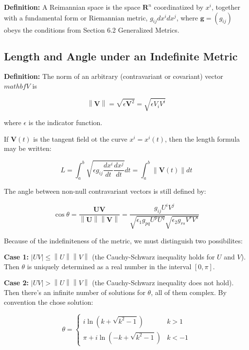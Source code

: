 \documentclass{article}
\newcommand\norm[1]{\left\lVert#1\right\rVert}
\begin{document}
\noindent \textbf{Definition: }
A Reimannian space is the space $\mathbf{ R }^n$ coordinatized by $x^i$, together with a fundamental form or Riemannian metric, $g_{ij} dx^i dx^j$, where $\mathbf{g} = (g_{ij})$ obeys the conditions from Section 6.2 Generalized Metrics.

\subsection{Length and Angle under an Indefinite Metric}

\noindent \textbf{Definition: }
The norm of an arbitrary (contravariant or covariant) vector $mathbf{ V }$ is

\begin{equation*}
	\norm{ \mathbf{ V } } = \sqrt{ \epsilon \mathbf{ V }^2 } = \sqrt{ \epsilon V_i V^i }
\end{equation*}

\noindent where $\epsilon$ is the indicator function.

If $\mathbf{ V }(t)$ is the tangent field ot the curve $x^i = x^i(t)$, then the length formula may be written:

\begin{equation}
	L = \int_a^b \sqrt{ \epsilon g_{ij} \frac{ dx^i }{ dt } \frac{ dx^j }{ dt } } dt = \int_a^b \norm{ \mathbf{ V }(t) } dt
\end{equation}

The angle between non-null contravariant vectors is still defined by:

\begin{equation}
	\cos{ \theta } = \frac{ \mathbf{ UV } }{ \norm{ \mathbf{ U } } \norm{ \mathbf{ V } } } = \frac{ g_{ij} U^i V^j }{ \sqrt{ \epsilon_1 g_{pq} U^p U^q } \sqrt{ \epsilon_2 g_{rs} V^r V^s } }
\end{equation}

Because of the indefiniteness of the metric, we must distinguish two possibilites:

\noindent \textbf{Case 1: }
$|UV| \leq \norm{ U }\norm{ V }$ (the Cauchy-Schwarz inequality holds for $U$ and $V$).  Then $\theta$ is uniquely determined as a real number in the interval $[0,\pi]$.

\noindent \textbf{Case 2: }
$|UV| > \norm{ U }\norm{ V }$ (the Cauchy-Schwarz inequality does not hold).  Then there's an infinite number of solutions for $\theta$, all of them complex.  By convention the chose solution:

\[ 
  \theta = 
  \begin{cases} 
  i \ln{ (k + \sqrt{ k^2 - 1 } ) } & k > 1 \\ 
  \pi + i \ln{ ( -k + \sqrt{ k^2 - 1 } ) } & k < -1
  \end{cases} 
\]
\end{document}
